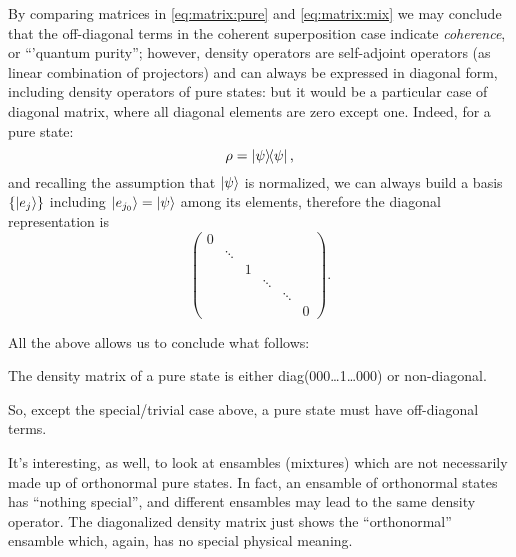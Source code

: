 By comparing matrices in \eqref{eq:matrix:pure} and \eqref{eq:matrix:mix}
we may conclude that the off-diagonal terms in the coherent superposition case
indicate \emph{coherence}, or ``'quantum purity'';
however, density operators are self-adjoint operators
(as linear combination of projectors) and can always be expressed in
diagonal form, including density operators of pure states: but it would be
a particular case of diagonal matrix, where all diagonal elements are zero
except one. Indeed, for a pure state:
\[
  \rho = \ketbra{\psi}{\psi}\text{,}
\]
and recalling the assumption that $\ket{\psi}$ is normalized,
we can always build a basis $\qty{\ket{e_j}}$ including $\ket{e_{j_0}} = \ket{\psi}$
among its elements, therefore the diagonal representation is
\[
  \begin{pmatrix}
    0           &       &       &       &       &           \\
                &\ddots &       &       &       &           \\
                &       &1      &       &       &           \\
                &       &       &\ddots &       &           \\
                &       &       &       &\ddots &           \\
                &       &       &       &       &0
  \end{pmatrix}\text{.}
\]

All the above allows us to conclude what follows:
\begin{remark}
  The density matrix of a pure state is either diag(000\dots1\dots000) or non-diagonal.

  So, except the special/trivial case above, a pure state must have off-diagonal terms.
\end{remark}

It's interesting, as well, to look at ensambles (mixtures)
which are not necessarily made up of orthonormal pure states.
In fact, an ensamble of orthonormal states has ``nothing special'',
and different ensambles may lead to the same density operator.
The diagonalized density matrix just shows the ``orthonormal''
ensamble which, again, has no special physical meaning.

